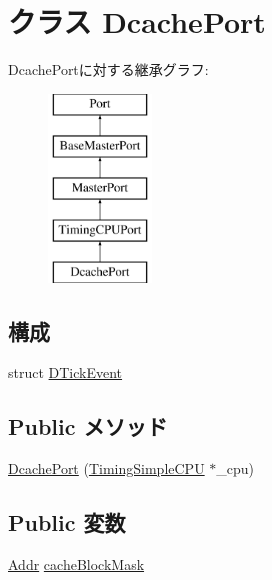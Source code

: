 \hypertarget{classTimingSimpleCPU_1_1DcachePort}{
\section{クラス DcachePort}
\label{classTimingSimpleCPU_1_1DcachePort}
}
DcachePortに対する継承グラフ:\begin{figure}[H]
\begin{center}
\leavevmode
\includegraphics[height=5cm]{classTimingSimpleCPU_1_1DcachePort}
\end{center}
\end{figure}
\subsection*{構成}
\begin{DoxyCompactItemize}
\item 
struct \hyperlink{structTimingSimpleCPU_1_1DcachePort_1_1DTickEvent}{DTickEvent}
\end{DoxyCompactItemize}
\subsection*{Public メソッド}
\begin{DoxyCompactItemize}
\item 
\hyperlink{classTimingSimpleCPU_1_1DcachePort_ae1acfc6b442a828753a2311f1325cec5}{DcachePort} (\hyperlink{classTimingSimpleCPU_1_1TimingSimpleCPU}{TimingSimpleCPU} $\ast$\_\-cpu)
\end{DoxyCompactItemize}
\subsection*{Public 変数}
\begin{DoxyCompactItemize}
\item 
\hyperlink{base_2types_8hh_af1bb03d6a4ee096394a6749f0a169232}{Addr} \hyperlink{classTimingSimpleCPU_1_1DcachePort_af4264b12b32db39099b579e1ed670312}{cacheBlockMask}
\end{DoxyCompactItemize}
